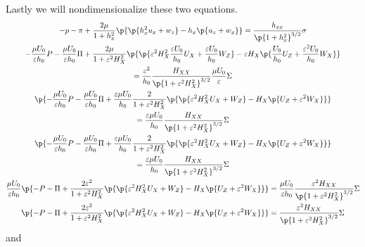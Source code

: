  Lastly we will nondimensionalize these two equations.
  \begin{gather*}
    -p - \pi + \frac{2 \mu}{1 + h_x^2} \p{\p{h_x^2 u_x + w_z}
      - h_x \p{u_z + w_x}} = \frac{h_{xx}}{\p{1 + h_x^2}^{3/2}} \sigma \\
    -\frac{\mu U_0}{\varepsilon h_0}P - \frac{\mu U_0}{\varepsilon h_0}\Pi + \frac{2 \mu}{1 + \varepsilon^2 H_X^2} \p{\p{\varepsilon^2 H_X^2 \frac{\varepsilon U_0}{h_0} U_X + \frac{\varepsilon U_0}{h_0} W_Z}
      - \varepsilon H_X \p{\frac{U_0}{h_0} U_Z + \frac{\varepsilon^2 U_0}{h_0} W_X}} \\
      = \frac{\varepsilon^2}{h_0}\frac{H_{XX}}{\p{1 + \varepsilon^2 H_X^2}^{3/2}} \frac{\mu U_0}{\varepsilon} \Sigma \\
    \p{-\frac{\mu U_0}{\varepsilon h_0}P - \frac{\mu U_0}{\varepsilon h_0}\Pi + \frac{\varepsilon \mu U_0}{h_0}\frac{2}{1 + \varepsilon^2 H_X^2} \p{\p{\varepsilon^2 H_X^2 U_X + W_Z}
      - H_X \p{U_Z + \varepsilon^2 W_X}}} \\
      = \frac{\varepsilon \mu U_0}{h_0}\frac{H_{XX}}{\p{1 + \varepsilon^2 H_X^2}^{3/2}} \Sigma \\
    \p{-\frac{\mu U_0}{\varepsilon h_0}P - \frac{\mu U_0}{\varepsilon h_0}\Pi + \frac{\varepsilon \mu U_0}{h_0}\frac{2}{1 + \varepsilon^2 H_X^2} \p{\p{\varepsilon^2 H_X^2 U_X + W_Z}
      - H_X \p{U_Z + \varepsilon^2 W_X}}} \\
      = \frac{\varepsilon \mu U_0}{h_0}\frac{H_{XX}}{\p{1 + \varepsilon^2 H_X^2}^{3/2}} \Sigma \\
    \frac{\mu U_0}{\varepsilon h_0}\p{-P - \Pi + \frac{2 \varepsilon^2}{1 + \varepsilon^2 H_X^2} \p{\p{\varepsilon^2 H_X^2 U_X + W_Z}
      - H_X \p{U_Z + \varepsilon^2 W_X}}}
      = \frac{\mu U_0}{\varepsilon h_0}\frac{\varepsilon^2 H_{XX}}{\p{1 + \varepsilon^2 H_X^2}^{3/2}} \Sigma \\
    \p{-P - \Pi + \frac{2 \varepsilon^2}{1 + \varepsilon^2 H_X^2} \p{\p{\varepsilon^2 H_X^2 U_X + W_Z}
      - H_X \p{U_Z + \varepsilon^2 W_X}}}
      = \frac{\varepsilon^2 H_{XX}}{\p{1 + \varepsilon^2 H_X^2}^{3/2}} \Sigma
  \end{gather*}
  and
